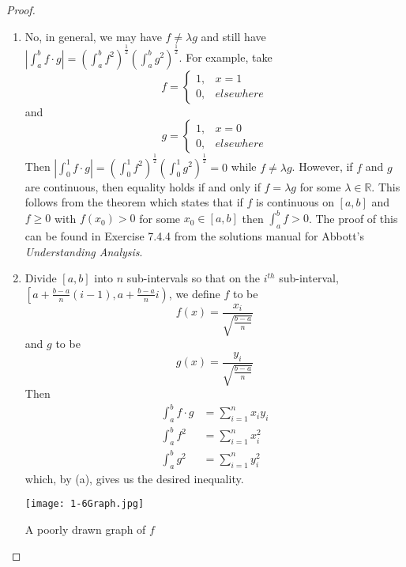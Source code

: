 \begin{enumerate}
\begin{proof}
\begin{enumerate}
        \item No, in general, we may have \( f \neq \lambda g \) and still have \( \left| \int_a^b f\cdot g \right| = \left( \int_a^b f^2 \right)^{\frac{1}{2}} \left( \int_a^b g^2 \right)^{\frac{1}{2}} \). For example, take
        \[
        f = \begin{cases} 1, & x=1 \\ 0, & elsewhere \end{cases}
        \]
        and
        \[
        g = \begin{cases} 1, & x=0 \\ 0, & elsewhere \end{cases}
        \]
        Then \( \left| \int_0^1 f\cdot g \right| = \left( \int_0^1 f^2 \right)^{\frac{1}{2}} \left( \int_0^1 g^2 \right)^{\frac{1}{2}} = 0\) while \( f \neq \lambda g \). However, if \( f \) and \( g \) are continuous, then equality holds if and only if \( f = \lambda g \) for some \( \lambda \in \mathbb{R} \). This follows from the theorem which states that if \( f \) is continuous on \( [a,b] \) and \( f \geq 0 \) with \( f(x_0) > 0 \) for some \( x_0 \in [a,b] \) then \( \int_a^b f > 0 \). The proof of this can be found in Exercise 7.4.4 from the solutions manual for Abbott's \emph{Understanding Analysis}.
        
        \item Divide \( [a,b] \) into \( n \) sub-intervals so that on the \( i^{th} \) sub-interval, \linebreak \( \left[a+\frac{b-a}{n}(i-1), a+\frac{b-a}{n}i\right) \), we define \( f \) to be
        \[
        f(x) = \frac{x_i}{\sqrt{\frac{b-a}{n}}}
        \]
        and \( g \) to be
        \[
        g(x) = \frac{y_i}{\sqrt{\frac{b-a}{n}}}
        \]
        Then
        \begin{align*}
            \int_a^b f\cdot g &= \sum_{i=1}^n x_iy_i \\
            \int_a^b f^2 &= \sum_{i=1}^n x_i^2 \\
            \int_a^b g^2 &= \sum_{i=1}^n y_i^2
        \end{align*}
        which, by (a), gives us the desired inequality.
        
        \pagebreak
        
        \begin{table*}
        \centering
        \texttt{[image: 1-6Graph.jpg]}
        \caption{A poorly drawn graph of \( f \)}
        \end{table*}
    \end{enumerate}
    \end{proof}
    

\end{enumerate}

